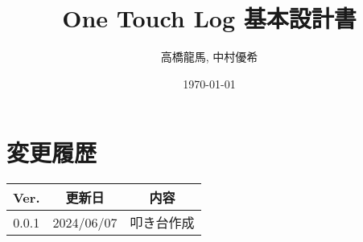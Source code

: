 \documentclass[a4paper,10pt,titlepage]{jreport}
\begin{document}
\title{One Touch Log 基本設計書}
\author{高橋龍馬, 中村優希}
\date{\today}
\maketitle

\section*{変更履歴}

\begin{longtable}[c]{|c|c|c|}
    \hline
        Ver. & 更新日 & 内容 \\
    \hline
    \endfirsthead
    \hline
        0.0.1 & 2024/06/07 & 叩き台作成 \\
    \hline
\end{longtable}

\newpage

\tableofcontents
\clearpage





\end{document}
